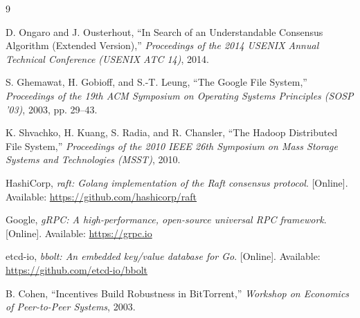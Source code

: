 \documentclass[12pt,a4paper]{report}
\begin{document}
\begin{thebibliography}{9}

D. Ongaro and J. Ousterhout, ``In Search of an Understandable Consensus Algorithm (Extended Version),'' \textit{Proceedings of the 2014 USENIX Annual Technical Conference (USENIX ATC 14)}, 2014.

S. Ghemawat, H. Gobioff, and S.-T. Leung, ``The Google File System,'' \textit{Proceedings of the 19th ACM Symposium on Operating Systems Principles (SOSP '03)}, 2003, pp. 29--43.

K. Shvachko, H. Kuang, S. Radia, and R. Chansler, ``The Hadoop Distributed File System,'' \textit{Proceedings of the 2010 IEEE 26th Symposium on Mass Storage Systems and Technologies (MSST)}, 2010.

HashiCorp, \textit{raft: Golang implementation of the Raft consensus protocol}. [Online]. Available: \url{https://github.com/hashicorp/raft}

Google, \textit{gRPC: A high-performance, open-source universal RPC framework}. [Online]. Available: \url{https://grpc.io}

etcd-io, \textit{bbolt: An embedded key/value database for Go}. [Online]. Available: \url{https://github.com/etcd-io/bbolt}

B. Cohen, ``Incentives Build Robustness in BitTorrent,'' \textit{Workshop on Economics of Peer-to-Peer Systems}, 2003.

\end{thebibliography}
\end{document}
